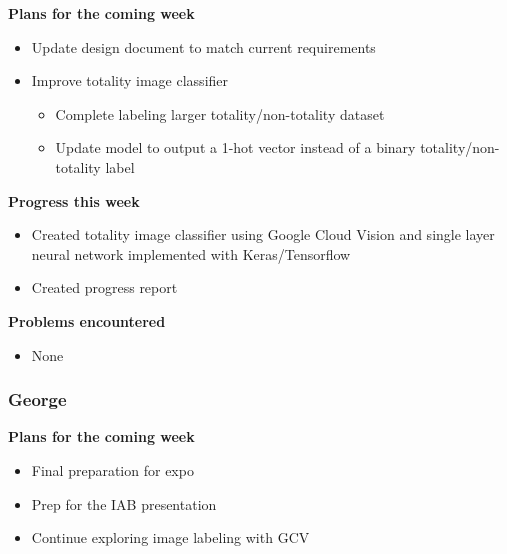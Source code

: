 \documentclass[10pt, onecolumn, draftclsnofoot, letterpaper, compsoc]{IEEEtran}
\begin{document}
    \noindent \textbf{Plans for the coming week}

    \begin{itemize}

    \item Update design document to match current requirements
    \item Improve totality image classifier
    \begin{itemize}
      \item Complete labeling larger totality/non-totality dataset
      \item Update model to output a 1-hot vector instead of a binary totality/non-totality label
    \end{itemize}

    \end{itemize}

    \noindent \textbf{Progress this week}

    \begin{itemize}

    \item Created totality image classifier using Google Cloud Vision and single
      layer neural network implemented with Keras/Tensorflow
    \item Created progress report

    \end{itemize}

    \noindent \textbf{Problems encountered}

    \begin{itemize}

    \item None

    \end{itemize}

    \subsubsection{George}

    \noindent \textbf{Plans for the coming week}

    \begin{itemize}

    \item Final preparation for expo
    \item Prep for the IAB presentation
    \item Continue exploring image labeling with GCV

    \end{itemize}
\end{document}

